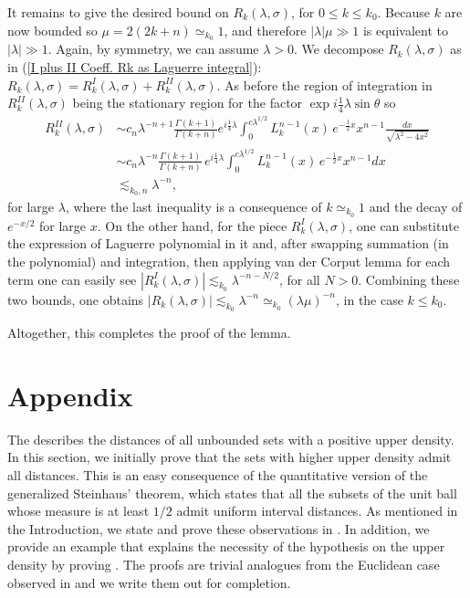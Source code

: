 \documentclass[11pt, reqno]{amsart}
\theoremstyle{plain}
\theoremstyle{remark}
\theoremstyle{example}
\theoremstyle{definition}
\numberwithin{equation}{section}
\begin{document}
It remains to give the desired bound on $R_{k}(\lambda, \sigma)$, for $0 \leq k \leq k_{0}$. Because $k$ are now bounded so  $\mu=2(2k+n) \simeq_{k_{0}} 1$, and therefore $|\lambda| \mu \gg 1$ is equivalent to $|\lambda| \gg 1$. Again, by symmetry, we can assume $\lambda>0$. We decompose $R_{k}(\lambda, \sigma)$ as in (\ref{I plus II Coeff. Rk as Laguerre integral}): $R_{k}(\lambda, \sigma)= R_{k}^{I}(\lambda, \sigma) + R_{k}^{II}(\lambda, \sigma)$. As before the region of integration in $R_{k}^{II}(\lambda, \sigma)$ being the stationary region for the factor $\exp i \frac{1}{4} \lambda \sin{\theta}$ so 
\begin{equation*}\label{x var. II Coeff. Rk as Laguerre integral bounded k}
   \begin{split}
       R_{k}^{II}(\lambda, \sigma) & \sim c_{n} \lambda^{-n+1}  \frac{\Gamma(k+1)}{\Gamma(k+n)} e^{i \frac{1}{4} \lambda}     \int_{0}^{c \lambda^{1/2}}  L_{k}^{n-1}(x) \, e^{-\frac{1}{2} x }  x^{n-1} \frac{dx}{\sqrt{\lambda^2 - 4 x^2}} \\
       & \sim c_{n} \lambda^{-n}  \frac{\Gamma(k+1)}{\Gamma(k+n)}  \,  e^{i \frac{1}{4} \lambda}       \int_{0}^{c \lambda^{1/2}}  L_{k}^{n-1}(x) \, e^{-\frac{1}{2} x }  x^{n-1} dx\\
       & \lesssim_{k_{0},n} \lambda^{-n},
   \end{split}
\end{equation*}
for large $\lambda$, where the last inequality is a consequence of $k \simeq_{k_{0}}1$ and the decay of $e^{-x/2}$ for large $x$. On the other hand, for the piece $R_{k}^{I}(\lambda, \sigma)$, one can substitute the expression of Laguerre polynomial in it and, after swapping summation (in the polynomial) and integration, then applying van der Corput lemma for each term one can easily see $|R_{k}^{I}(\lambda, \sigma)| \lesssim_{k_{0}} \lambda^{-n - N/2}$, for all $N>0$. Combining these two bounds, one obtains $|R_{k}(\lambda, \sigma)| \lesssim_{k_{0}} \lambda^{-n} \simeq_{k_{0}} (\lambda \mu)^{-n}$, in the case $k \leq k_{0}$.

Altogether, this completes the proof of the lemma.

\section{Appendix}\label{appendix}
 The  describes the distances of all unbounded sets with a positive upper density. In this section, we initially prove that the sets with higher upper density admit all distances. This is an easy consequence of the quantitative version of the generalized Steinhaus' theorem, which states that all the subsets of the unit ball whose measure is at least $1/2$ admit uniform interval distances. As mentioned in the Introduction, we state and prove these observations in . In addition, we provide an example that explains the necessity of the hypothesis on the upper density by proving  . The proofs are trivial analogues from the Euclidean case observed in \cite[Section 10.1]{Pramanik-Raani2023} and we write them out for completion.
 
\end{document}
